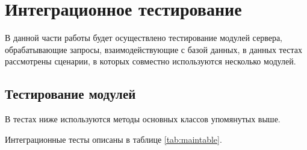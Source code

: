\chapter{Интеграционное тестирование}

В данной части работы будет осуществлено тестирование модулей сервера, обрабатывающие запросы, взаимодействующие с базой данных, в данных тестах рассмотрены сценарии, в которых совместно используются несколько модулей.

\section{Тестирование модулей}
В тестах ниже используются методы основных классов упомянутых выше. 


Интеграционные тесты описаны в таблице \ref{tab:maintable}.

